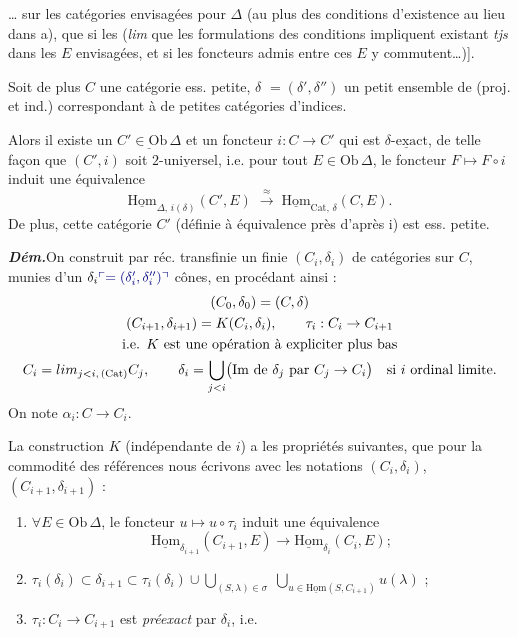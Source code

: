 \documentclass[11pt,a4paper]{article}
\begin{document}
… sur les catégories envisagées pour $\Delta$ (au plus des conditions
d'existence  au lieu dans a), que si les 
(\emph{lim} que les formulations des conditions impliquent existant
\emph{tjs} dans les $E$ envisagées, et si les foncteurs admis entre ces
$E$ y commutent…)].

Soit de plus $C$ une catégorie ess. petite, $\delta$ 
 $= (\delta', \delta'')$ un petit ensemble de \ill{} (proj. et ind.)
 correspondant à de petites catégories d'indices.

Alors il existe un $\underline{C' \in \mathrm{Ob}\,\Delta}$ et un foncteur
$i : C \to C'$ qui est $\underline{\delta\text{-exact}}$, de telle façon que
$(C', i)$ soit $\underline{2\text{-universel}}$, i.e. pour tout $E \in
\mathrm{Ob}\,\Delta$, le foncteur $F \mapsto F \circ i$ induit une équivalence
\[
  \underline{\mathrm{Hom}}_{\Delta,\, i(\delta)}(C', E)
  \;\xrightarrow{\ \approx\ }\;
  \underline{\mathrm{Hom}}_{\mathrm{Cat},\, \delta}(C, E) .
\]
De plus, cette catégorie $C'$ (définie à équivalence \struck{\ill{}} près
d'après i) est ess. petite.

\textbf{\emph{Dém.}}\quad On construit par réc. transfinie un
   \ill{} finie
$(C_{i}, \delta_{i})$ de catégories sur $C$, munies d'un $\delta_{i}
\add{= (\delta'_{i}, \delta''_{i})}$  cônes, en procédant ainsi :
\begin{gather*}
  (C_{0}, \delta_{0}) = (C, \delta) \\
  (C_{i+1}, \delta_{i+1}) = K(C_{i}, \delta_{i}), \qquad
  \tau_{i} : C_{i} \to C_{i+1} \\
  \text{i.e. } K \text{ est une opération à expliciter plus bas} \\
  C_{i} = \varinjlim_{j < i,\,(\mathrm{Cat})} C_{j}, \qquad
  \delta_{i} = \bigcup_{j < i}
    \bigl(\mathrm{Im}\ \text{de } \delta_{j} \text{ par } C_{j} \to C_{i}\bigr)
  \quad \text{si } i \text{ ordinal limite.}
\end{gather*}
On note $\alpha_{i} : C \longrightarrow C_{i}$.

La construction $K$ (indépendante de $i$) a les propriétés suivantes, que pour
la commodité des références nous écrivons avec les notations
$(C_{i}, \delta_{i})$, $(C_{i+1}, \delta_{i+1})$ :

\begin{enumerate}
  \item[a)] $\forall E \in \mathrm{Ob}\,\Delta$, le foncteur $u \mapsto u \circ
    \tau_{i}$ induit une équivalence
    \[
      \underline{\mathrm{Hom}}_{\delta_{i+1}}(C_{i+1}, E)
      \longrightarrow
      \underline{\mathrm{Hom}}_{\delta_{i}}(C_{i}, E) ;
    \]
  \item[b)] $\displaystyle \tau_{i}(\delta_{i}) \subset \delta_{i+1} \subset
    \tau_{i}(\delta_{i}) \cup \bigcup_{(S,\lambda) \in \sigma} \;
    \bigcup_{u \in \underline{\mathrm{Hom}}(S, C_{i+1})} u(\lambda)$ ;
  \item[c)] $\tau_{i} : C_{i} \to C_{i+1}$ est \emph{préexact} par
     $\delta_{i}$, i.e.
\end{enumerate}
\end{document}
